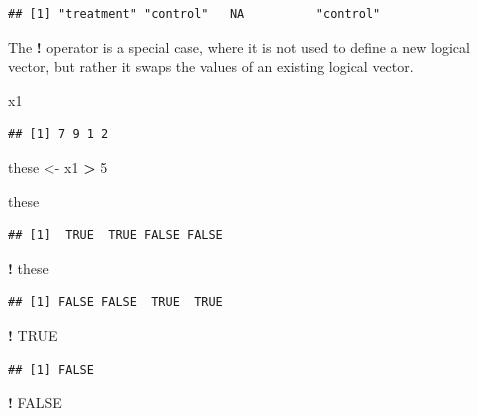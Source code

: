 \documentclass[]{book}
\newenvironment{Shaded}{\begin{snugshade}}{\end{snugshade}}
\newcommand{\DecValTok}[1]{\textcolor[rgb]{0.00,0.00,0.81}{#1}}
\newcommand{\NormalTok}[1]{#1}
\newcommand{\OperatorTok}[1]{\textcolor[rgb]{0.81,0.36,0.00}{\textbf{#1}}}
\newcommand{\OtherTok}[1]{\textcolor[rgb]{0.56,0.35,0.01}{#1}}
\newcommand{\StringTok}[1]{\textcolor[rgb]{0.31,0.60,0.02}{#1}}
\theoremstyle{definition}
\theoremstyle{definition}
\theoremstyle{definition}
\theoremstyle{remark}
\begin{document}
\begin{verbatim}
## [1] "treatment" "control"   NA          "control"
\end{verbatim}

The \textbf{!} operator is a special case, where it is not used to
define a new logical vector, but rather it swaps the values of an
existing logical vector.

\begin{Shaded}
\begin{Highlighting}[]
\NormalTok{x1}
\end{Highlighting}
\end{Shaded}

\begin{verbatim}
## [1] 7 9 1 2
\end{verbatim}

\begin{Shaded}
\begin{Highlighting}[]
\NormalTok{these <-}\StringTok{ }\NormalTok{x1 }\OperatorTok{>}\StringTok{ }\DecValTok{5}

\NormalTok{these}
\end{Highlighting}
\end{Shaded}

\begin{verbatim}
## [1]  TRUE  TRUE FALSE FALSE
\end{verbatim}

\begin{Shaded}
\begin{Highlighting}[]
\OperatorTok{!}\StringTok{ }\NormalTok{these}
\end{Highlighting}
\end{Shaded}

\begin{verbatim}
## [1] FALSE FALSE  TRUE  TRUE
\end{verbatim}

\begin{Shaded}
\begin{Highlighting}[]
\OperatorTok{!}\StringTok{ }\OtherTok{TRUE}
\end{Highlighting}
\end{Shaded}

\begin{verbatim}
## [1] FALSE
\end{verbatim}

\begin{Shaded}
\begin{Highlighting}[]
\OperatorTok{!}\StringTok{ }\OtherTok{FALSE}
\end{Highlighting}
\end{Shaded}
\end{document}
